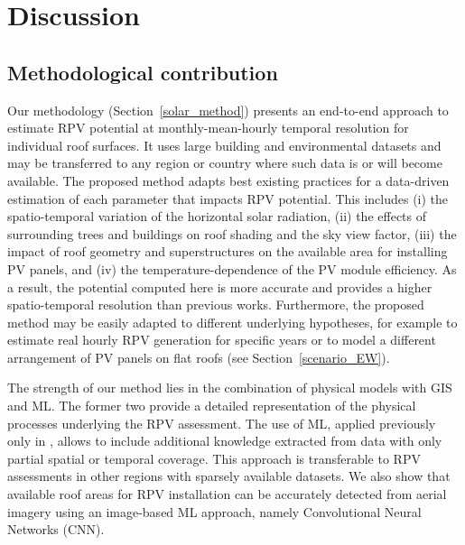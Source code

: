 



\section{Discussion}
\label{discussion_pv}

\subsection{Methodological contribution}

Our methodology (Section~\ref{solar_method}) presents an end-to-end approach to estimate RPV potential at monthly-mean-hourly temporal resolution for individual roof surfaces. It uses large building and environmental datasets and may be transferred to any region or country where such data is or will become available. 
The proposed method adapts best existing practices for a data-driven estimation of each parameter that impacts RPV potential. This includes
(i) the spatio-temporal variation of the horizontal solar radiation,
(ii) the effects of surrounding trees and buildings on roof shading and the sky view factor,
(iii) the impact of roof geometry and superstructures on the available area for installing PV panels, and
(iv) the temperature-dependence of the PV module efficiency.
As a result, the potential computed here is more accurate and provides a higher spatio-temporal resolution than previous works.
Furthermore, the proposed method may be easily adapted to different underlying hypotheses, for example to estimate real hourly RPV generation for specific years or to model a different arrangement of PV panels on flat roofs (see Section~\ref{scenario_EW}).

The strength of our method lies in the combination of physical models with GIS and ML. The former two provide a detailed representation of the physical processes underlying the RPV assessment. The use of ML, applied previously only in \cite{assouline_quantifying_2017, assouline_large-scale_2018}, allows to include additional knowledge extracted from data with only partial spatial or temporal coverage. This approach is transferable to RPV assessments in other regions with sparsely available datasets.
We also show that available roof areas for RPV installation can be accurately detected from aerial imagery using an image-based ML approach, namely Convolutional Neural Networks (CNN).

